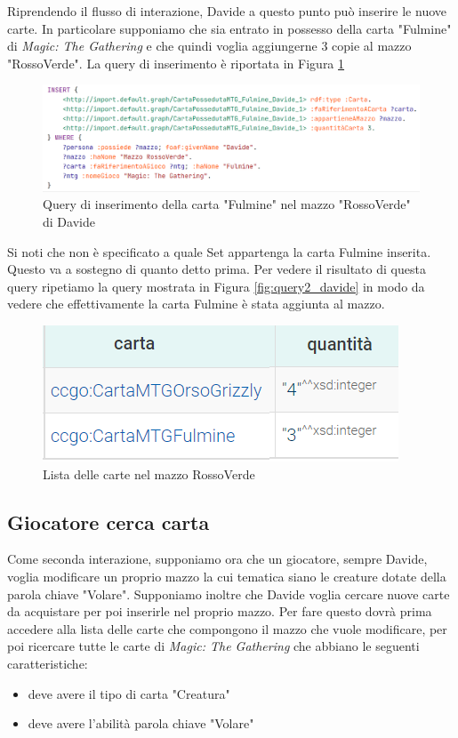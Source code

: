 \documentclass[12pt]{article}
\begin{document}
Riprendendo il flusso di interazione, Davide a questo punto può inserire le nuove carte. In particolare supponiamo che sia entrato in possesso della carta "Fulmine" di \textit{Magic: The Gathering} e che quindi voglia aggiungerne 3 copie al mazzo "RossoVerde". La query di inserimento è riportata in Figura \ref{fig:query3_davide}

\begin{figure}[H]
    \centering
    \includegraphics[width=14cm]{files/query3_davide.png}
    \caption{Query di inserimento della carta "Fulmine" nel mazzo "RossoVerde" di Davide}
    \label{fig:query3_davide}
\end{figure}

Si noti che non è specificato a quale Set appartenga la carta Fulmine inserita. Questo va a sostegno di quanto detto prima.\newline
Per vedere il risultato di questa query ripetiamo la query mostrata in Figura \ref{fig:query2_davide} in modo da vedere che effettivamente la carta Fulmine è stata aggiunta al mazzo.

\begin{figure}[H]
    \centering
    \includegraphics[]{files/res3_davide.png}
    \caption{Lista delle carte nel mazzo RossoVerde}
    \label{fig:res3_davide}
\end{figure}

\subsection{Giocatore cerca carta}
Come seconda interazione, supponiamo ora che un giocatore, sempre Davide, voglia modificare un proprio mazzo la cui tematica siano le creature dotate della parola chiave "Volare". Supponiamo inoltre che Davide voglia cercare nuove carte da acquistare per poi inserirle nel proprio mazzo. Per fare questo dovrà prima accedere alla lista delle carte che compongono il mazzo che vuole modificare, per poi ricercare tutte le carte di \textit{Magic: The Gathering} che abbiano le seguenti caratteristiche:
\begin{itemize}
    \item deve avere il tipo di carta "Creatura"
    \item deve avere l'abilità parola chiave "Volare"
\end{itemize}
\end{document}

